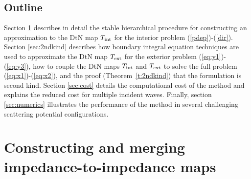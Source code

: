 \documentclass[11pt,final]{amsart}
\theoremstyle{definition}
\numberwithin{remark}{section}
\numberwithin{definition}{section}
\numberwithin{pro}{section}
\begin{document}

\subsection{Outline}
Section \ref{sec:spec} describes in detail the stable hierarchical procedure for constructing an
approximation to the DtN map $T_{\rm int}$ for the interior problem (\ref{pdep})-(\ref{dir}).
Section \ref{sec:2ndkind} describes how boundary integral equation techniques are
used to approximate the DtN map $T_{\rm ext}$ for the exterior problem (\ref{eq:y1})-(\ref{eq:y3}),
how to couple the DtN maps $T_{\rm int}$ and $T_{\rm ext}$ to solve
the full problem (\ref{eq:x1})-(\ref{eq:x2}), and the proof (Theorem~\ref{t:2ndkind})
that the formulation is second kind.
Section \ref{sec:cost}
details the computational cost of the method and explains the reduced cost for multiple incident
waves.  Finally, section \ref{sec:numerics} illustrates
the performance of the method in several challenging scattering potential
configurations.


\section{Constructing and merging impedance-to-impedance maps}
\label{sec:spec}
\end{document}
